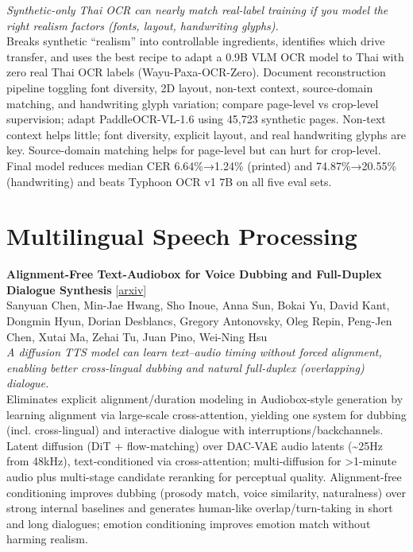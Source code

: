 \documentclass[12pt,letterpaper]{article}
\begin{document}
{\small\textit{Synthetic-only Thai OCR can nearly match real-label training if you model the right realism factors (fonts, layout, handwriting glyphs).}}\\[1pt]
{\footnotesize Breaks synthetic ``realism'' into controllable ingredients, identifies which drive transfer, and uses the best recipe to adapt a 0.9B VLM OCR model to Thai with zero real Thai OCR labels (Wayu-Paxa-OCR-Zero). Document reconstruction pipeline toggling font diversity, 2D layout, non-text context, source-domain matching, and handwriting glyph variation; compare page-level vs crop-level supervision; adapt PaddleOCR-VL-1.6 using 45,723 synthetic pages. Non-text context helps little; font diversity, explicit layout, and real handwriting glyphs are key. Source-domain matching helps for page-level but can hurt for crop-level. Final model reduces median CER 6.64\%→1.24\% (printed) and 74.87\%→20.55\% (handwriting) and beats Typhoon OCR v1 7B on all five eval sets.}

\medskip


\section*{Multilingual Speech Processing}

{\small\textbf{Alignment-Free Text-Audiobox for Voice Dubbing and Full-Duplex Dialogue Synthesis}} {\scriptsize[\href{https://arxiv.org/abs/2609.03992}{arxiv}]}\\
{\scriptsize Sanyuan Chen, Min-Jae Hwang, Sho Inoue, Anna Sun, Bokai Yu, David Kant, Dongmin Hyun, Dorian Desblancs, Gregory Antonovsky, Oleg Repin, Peng-Jen Chen, Xutai Ma, Zehai Tu, Juan Pino, Wei-Ning Hsu}\\

{\small\textit{A diffusion TTS model can learn text--audio timing without forced alignment, enabling better cross-lingual dubbing and natural full-duplex (overlapping) dialogue.}}\\[1pt]
{\footnotesize Eliminates explicit alignment/duration modeling in Audiobox-style generation by learning alignment via large-scale cross-attention, yielding one system for dubbing (incl. cross-lingual) and interactive dialogue with interruptions/backchannels. Latent diffusion (DiT + flow-matching) over DAC-VAE audio latents (\textasciitilde{}25Hz from 48kHz), text-conditioned via cross-attention; multi-diffusion for >1-minute audio plus multi-stage candidate reranking for perceptual quality. Alignment-free conditioning improves dubbing (prosody match, voice similarity, naturalness) over strong internal baselines and generates human-like overlap/turn-taking in short and long dialogues; emotion conditioning improves emotion match without harming realism.}
\end{document}
